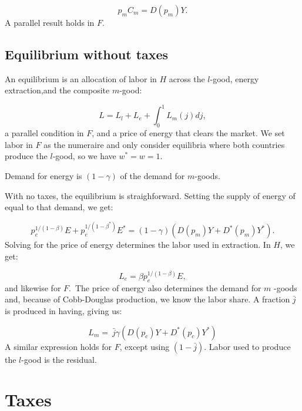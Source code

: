 \documentclass[notitlepage,12pt]{article}
\begin{document}
\begin{equation*}
p_{m}C_{m}=D\left( p_{m}\right) Y.
\end{equation*}%
A parallel result holds in $F$.

\subsection{Equilibrium without taxes}

An equilibrium is an allocation of labor in $H$ across the $l$-good, energy
extraction,and the composite $m$-good:

\begin{equation*}
L=L_{l}+L_{e}+\int_{0}^{1}L_{m}\left( j\right) dj,
\end{equation*}%
a parallel condition in $F$, and a price of energy that clears the market.
We set labor in $F$ as the numeraire and only consider equilibria where both
countries produce the $l$-good, so we have $w^{\ast }=w=1$.

Demand for energy is $\left( 1-\gamma \right) $ of the demand for $m$-goods.

With no taxes, the equilibrium is straighforward. Setting the supply of
energy of equal to that demand, we get:

\begin{equation}
p_{e}^{1/\left( 1-\beta \right) }E+p_{e}^{1/\left( 1-\beta ^{\ast }\right)
}E^{\ast }=\left( 1-\gamma \right) \left( D\left( p_{m}\right) Y+D^{\ast
}\left( p_{m}\right) Y^{\ast }\right) .  \label{EQ condition}
\end{equation}%
Solving for the price of energy determines the labor used in extraction. In $%
H$, we get:

\begin{equation*}
L_{e}=\beta p_{e}^{1/\left( 1-\beta \right) }E,
\end{equation*}%
and likewise for $F$.\ The price of energy also determines the demand for $m$%
-goods and, because of Cobb-Douglas production, we know the labor share. A
fraction $\bar{j}$ is produced in having, giving us:

\begin{equation*}
L_{m}=\ \bar{j}\gamma \left( D(p_{c})Y+D^{\ast }(p_{c})Y^{\ast }\right)
\end{equation*}%
A similar expression holds for $F$, except using $\left( 1-\bar{j}\right) $.
Labor used to produce the $l$-good is the residual.

\section{Taxes}
\end{document}
